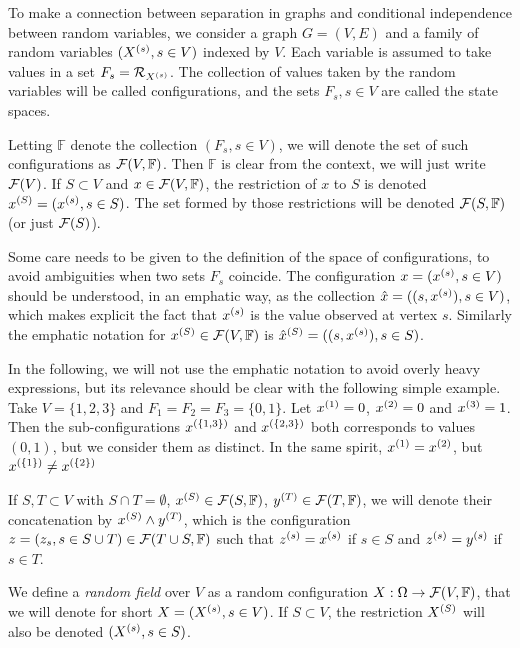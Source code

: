 To make a connection between separation in graphs and conditional
independence between random variables, we consider a graph $G=(V,E)$
and a family of random variables $(X^{(s)}, s\in V)$ indexed by $V$. Each variable is assumed to take values in a set $F_s = {\mathcal R}_{X^{(s)}}$. The collection of values taken by the random variables will be called configurations, and the sets $F_s, s\in V$ are called the state spaces.

Letting $\mathbb F$ denote the collection $(F_s, s\in V)$, we will denote the set of such configurations as ${\mathcal F}(V, \mathbb F)$. Then $\mathbb F$ is clear from the context, we will just write ${\mathcal F}(V)$. If $S \subset V$ and $x\in {\mathcal F}(V, \mathbb F)$, the restriction of $x$ to $S$ is denoted $x^{(S)} = (x^{(s)}, s\in S)$. The set formed by those restrictions will be denoted ${\mathcal F}(S, \mathbb F)$ (or just ${\mathcal F}(S)$).

\begin{remark}
\label{rem:configurations}
Some care needs to be given to the definition of the space of configurations, to avoid ambiguities when two sets $F_s$ coincide. The configuration $x = (x^{(s)}, s\in V)$ should be understood, in an emphatic way, as the collection $\hat x = ((s,x^{(s)}), s\in V)$, which makes explicit the fact that $x^{(s)}$ is the value observed at vertex $s$. Similarly the emphatic notation for  $x^{(S)} \in {\mathcal F}(V, \mathbb F)$ is $\hat x^{(S)} = ((s,x^{(s)}), s\in S)$. 

In the following, we will not use the emphatic notation to avoid overly heavy expressions, but its relevance should be clear with the following simple example. Take $V = \{1, 2, 3\}$ and $F_1 = F_2 = F_3 = \{0, 1\}$. Let $x^{(1)} = 0$, $x^{(2)} = 0$ and $x^{(3)} = 1$. Then the sub-configurations $x^{(\{1,3\})}$ and $x^{(\{2,3\})}$ both corresponds to values $(0,1)$, but we consider them as distinct. In the same spirit, $x^{(1)} = x^{(2)}$, but $x^{(\{1\})} \neq x^{(\{2\})}$
\end{remark}


If $S, T\subset V$ with $S\cap T=\emptyset$, $x^{(S)}\in {\mathcal F}(S, \mathbb F)$, $y^{(T)}\in {\mathcal F}(T, \mathbb F)$, we will denote their concatenation by 
$x^{(S)} \wedge y^{(T)}$, which is the configuration $z = (z_s, s\in S\cup T)\in {\mathcal F}(T\cup S, \mathbb F)$ such that $z^{(s)}=x^{(s)}$ if $s\in S$ and $z^{(s)}=y^{(s)}$ if $s\in T$.



We define a {\em random field} over $V$ as a random configuration $X:\Omega \to {\mathcal F}(V,  \mathbb F)$, that we will denote for short $X = (X^{(s)}, s\in V)$. If $S\subset V$, the restriction $X^{(S)}$ will also be denoted $(X^{(s)}, s\in
S)$. 
  
